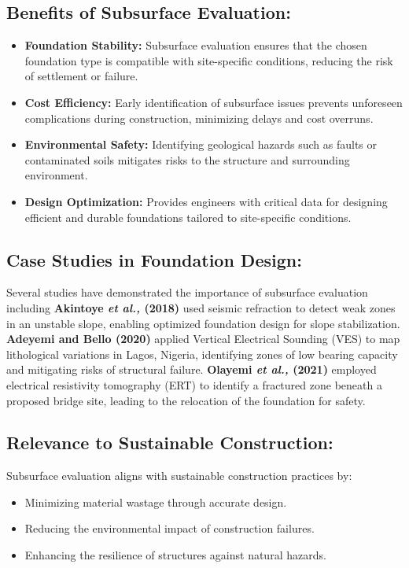 \documentclass[12pt,a4paper]{report}
\begin{document}
\subsection{Benefits of Subsurface Evaluation:}
\begin{itemize}
    \item \textbf{Foundation Stability:} Subsurface evaluation ensures that the chosen foundation type is compatible with site-specific conditions, reducing the risk of settlement or failure.
    \item \textbf{Cost Efficiency:} Early identification of subsurface issues prevents unforeseen complications during construction, minimizing delays and cost overruns.
    \item \textbf{Environmental Safety:} Identifying geological hazards such as faults or contaminated soils mitigates risks to the structure and surrounding environment.
    \item \textbf{Design Optimization:} Provides engineers with critical data for designing efficient and durable foundations tailored to site-specific conditions.
\end{itemize}

\subsection{Case Studies in Foundation Design:}
Several studies have demonstrated the importance of subsurface evaluation including \textbf{Akintoye \textit{et al.,} (2018)} used seismic refraction to detect weak zones in an unstable slope, enabling optimized foundation design for slope stabilization. \textbf{Adeyemi and Bello (2020)} applied Vertical Electrical Sounding (VES) to map lithological variations in Lagos, Nigeria, identifying zones of low bearing capacity and mitigating risks of structural failure. \textbf{Olayemi \textit{et al.,} (2021)} employed electrical resistivity tomography (ERT) to identify a fractured zone beneath a proposed bridge site, leading to the relocation of the foundation for safety.


\subsection{Relevance to Sustainable Construction:}
Subsurface evaluation aligns with sustainable construction practices by:
\begin{itemize}
    \item Minimizing material wastage through accurate design.
    \item Reducing the environmental impact of construction failures.
    \item Enhancing the resilience of structures against natural hazards.
\end{itemize}
\end{document}
